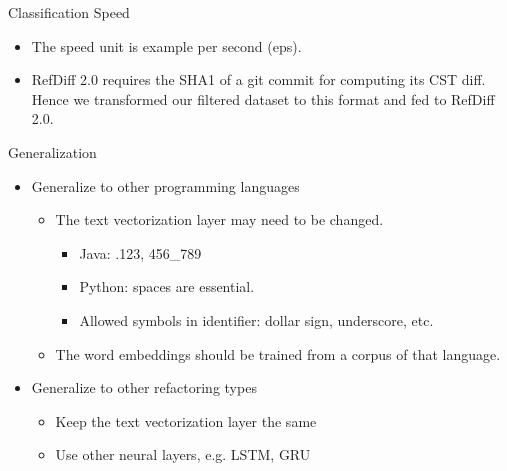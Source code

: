 \documentclass[xcolor=svgnames]{beamer}
\begin{document}
\begin{frame}{Classification Speed}

\begin{itemize}
	\item The speed unit is example per second (eps).
	\item RefDiff 2.0 requires the SHA1 of a git commit for computing its CST diff.
	Hence we transformed our filtered dataset to this format and fed to RefDiff 2.0.
\end{itemize}


\begin{figure}
\centering
{}
\end{figure}

\end{frame}


\begin{frame}{Generalization}
\begin{itemize}
\item Generalize to other programming languages
	\begin{itemize}
	\item The text vectorization layer may need to be changed.
	\begin{itemize}
		\item Java: .123, 456\_789
		\item Python: spaces are essential.
		\item Allowed symbols in identifier: dollar sign, underscore, etc.
	\end{itemize}
	\item The word embeddings should be trained from a corpus of that language.
	\end{itemize}
\item<2-> Generalize to other refactoring types
	\begin{itemize}
		\item Keep the text vectorization layer the same
		\item Use other neural layers, e.g. LSTM, GRU
	\end{itemize}
\end{itemize}
\end{frame}
\end{document}
